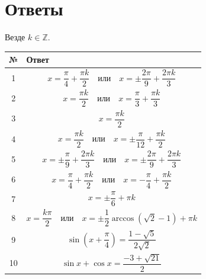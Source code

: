 \documentclass[a4paper,12pt]{article}
\newcommand{\Z}{\mathbb{Z}}
\begin{document}
\newpage

\section*{\textcolor{darkaccent}{Ответы}}

Везде $k\in\Z$.

\begin{center}
\renewcommand{\arraystretch}{1.6}
\begin{tabularx}{\linewidth}{@{}cX@{}}
\toprule
№ & Ответ \\
\midrule
1 &
\[
x=\frac{\pi}{4}+\frac{\pi k}{2}
\quad\text{или}\quad
x=\pm\frac{2\pi}{9}+\frac{2\pi k}{3}
\]
\\

2 &
\[
x=\frac{\pi k}{2}
\quad\text{или}\quad
x=\frac{\pi}{3}+\frac{\pi k}{3}
\]
\\

3 &
\[
x=\frac{\pi k}{2}
\]
\\

4 &
\[
x=\frac{\pi k}{2}
\quad\text{или}\quad
x=\pm\frac{\pi}{12}+\frac{\pi k}{2}
\]
\\

5 &
\[
x=\pm\frac{\pi}{9}+\frac{2\pi k}{3}
\quad\text{или}\quad
x=\pm\frac{2\pi}{9}+\frac{2\pi k}{3}
\]
\\

6 &
\[
x=\frac{\pi}{4}+\frac{\pi k}{2}
\quad\text{или}\quad
x=-\frac{\pi}{4}+\frac{\pi k}{2}
\]
\\

7 &
\[
x=\pm\frac{\pi}{6}+\pi k
\]
\\

8 &
\[
x=\frac{k\pi}{2}
\quad\text{или}\quad
x=\pm\frac12\arccos(\sqrt2-1)+\pi k
\]
\\

9 &
\[
\sin\left(x+\frac{\pi}{4}\right)=\frac{1-\sqrt5}{2\sqrt2}
\]
\\

10 &
\[
\sin x+\cos x=\frac{-3+\sqrt{21}}{2}
\]
\\
\bottomrule
\end{tabularx}
\end{center}
\end{document}
